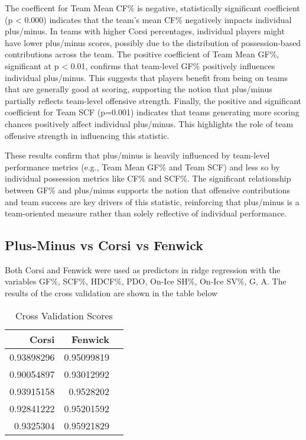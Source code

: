 \documentclass[12pt]{article}
\begin{document}
The coefficent for Team Mean CF\% is negative, statistically significant coefficient (p < 0.000) indicates that the team’s mean CF\% 
negatively impacts individual plus/minus. In teams with higher Corsi percentages, individual players might have lower plus/minus scores, 
possibly due to the distribution of possession-based contributions across the team. The positive coefficient of Team Mean GF\%, 
significant at p < 0.01, confirms that team-level GF\% positively influences individual plus/minus. This suggests that players benefit 
from being on teams that are generally good at scoring, supporting the notion that plus/minus partially reflects team-level offensive 
strength. Finally, the positive and significant coefficient for Team SCF (p=0.001) indicates that teams generating more scoring chances 
positively affect individual plus/minus. This highlights the role of team offensive strength in influencing this statistic.

These results confirm that plus/minus is heavily influenced by team-level performance metrics (e.g., Team Mean GF\% and Team SCF) 
and less so by individual possession metrics like CF\% and SCF\%. The significant relationship between GF\% and plus/minus supports 
the notion that offensive contributions and team success are key drivers of this statistic, reinforcing that plus/minus is a 
team-oriented measure rather than solely reflective of individual performance.


\subsection{Plus-Minus vs Corsi vs Fenwick}

Both Corsi and Fenwick were used as predictors in ridge regression with the variables GF\%, SCF\%, HDCF\%, PDO, On-Ice SH\%, On-Ice SV\%, G, A.
The results of the cross validation are shown in the table below

\begin{table}[tbp]
  \caption{Cross Validation Scores}
  \label{tab:rv}
\centering
\begin{tabular}{rrr}
  \toprule
Corsi & Fenwick \\ 
  \midrule
  0.93898296 & 0.95099819 \\ 
  0.90054897 & 0.93012992 \\ 
  0.93915158 & 0.9528202 \\ 
  0.92841222 & 0.95201592 \\ 
  0.9325304 & 0.95921829 \\ 
   \bottomrule
\end{tabular}
\end{table}
\end{document}

